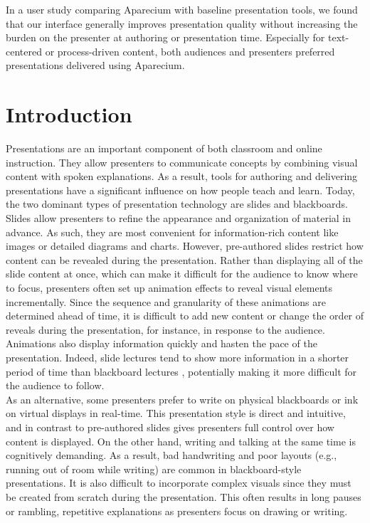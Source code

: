 In a user study comparing Aparecium with baseline presentation tools, we found that our interface generally improves presentation quality without increasing the burden on the presenter at authoring or presentation time. Especially for text-centered or process-driven content, both audiences and presenters preferred presentations delivered using Aparecium.

\section{Introduction}

Presentations are an important component of both classroom and online instruction. 
They allow presenters to communicate concepts by combining visual content with spoken explanations.
As a result, tools for authoring and delivering presentations have a significant influence on how people teach and learn.
Today, the two dominant types of presentation technology are slides and blackboards.\\

Slides allow presenters to refine the appearance and organization of material in advance. As such, they are most convenient for information-rich content like images or detailed diagrams and charts. 
However, pre-authored slides restrict how content can be revealed during the presentation. Rather than displaying all of the slide content at once, which can make it difficult for the audience to know where to focus, presenters often set up animation effects to reveal visual elements incrementally. Since the sequence and granularity of these animations are determined ahead of time, it is difficult to add new content or change the order of reveals during the presentation, for instance, in response to the audience.
%
Animations also display information quickly and hasten the pace of the presentation. Indeed, slide lectures tend to show more information in a shorter period of time than blackboard lectures \cite{lanir2008observing}, potentially making it more difficult for the audience to follow.\\

As an alternative, some presenters prefer to write on physical blackboards or ink on virtual displays in real-time. This presentation style is direct and intuitive, and in contrast to pre-authored slides gives presenters full control over how content is displayed.
%
On the other hand, writing and talking at the same time is cognitively demanding. As a result, bad handwriting and poor layouts (e.g., running out of room while writing) are common in blackboard-style presentations. It is also difficult to incorporate complex visuals since they must be created from scratch during the presentation. This often results in long pauses or rambling, repetitive explanations as presenters focus on drawing or writing.\\

